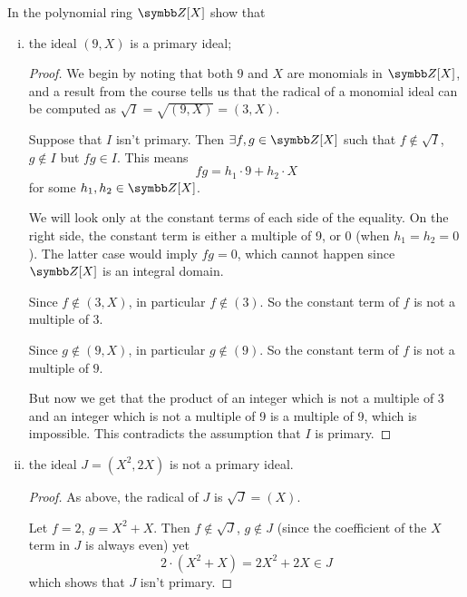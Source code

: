 \begin{problem*}{6}
In the polynomial ring \(\integers[X]\) show that
\begin{enumerate}[(i)]
    \item the ideal \((9, X)\) is a primary ideal;
    \begin{proof}
    We begin by noting that both \(9\) and \(X\) are monomials in \(\integers[X]\), and a result from the course tells us that the radical of a monomial ideal can be computed as \(\sqrt{I} = \sqrt{(9, X)} = (3, X)\).
    
    Suppose that \(I\) isn't primary. Then \(\exists f, g \in \integers[X]\) such that \(f \not\in \sqrt{I}\), \(g \not \in I\) but \(f g \in I\). This means
    \[
        fg = h_1 \cdot 9 + h_2 \cdot X
    \]
    for some \(h_1, h_2 \in \integers[X]\).
    
    We will look only at the constant terms of each side of the equality. On the right side, the constant term is either a multiple of 9, or 0 (when \(h_1 = h_2 = 0\)). The latter case would imply \(fg = 0\), which cannot happen since \(\integers[X]\) is an integral domain.
    
    Since \(f \not\in (3, X)\), in particular \(f \not\in (3)\). So the constant term of \(f\) is not a multiple of \(3\).
    
    Since \(g \not\in (9, X)\), in particular \(g \not\in (9)\). So the constant term of \(f\) is not a multiple of \(9\).
    
    But now we get that the product of an integer which is not a multiple of 3 and an integer which is not a multiple of 9 is a multiple of 9, which is impossible. This contradicts the assumption that \(I\) is primary.
    \end{proof}
    
    \item the ideal \(J = (X^2, 2X)\) is not a primary ideal.
    \begin{proof}
    As above, the radical of \(J\) is \(\sqrt{J} = (X)\).
    
    Let \(f = 2\), \(g = X^2 + X\). Then \(f \not\in \sqrt{J}\), \(g \not\in J\) (since the coefficient of the \(X\) term in \(J\) is always even) yet
    \[
        2 \cdot (X^2 + X) = 2X^2 + 2X \in J
    \]
    which shows that \(J\) isn't primary.
    \end{proof}
\end{enumerate}
\end{problem*}

